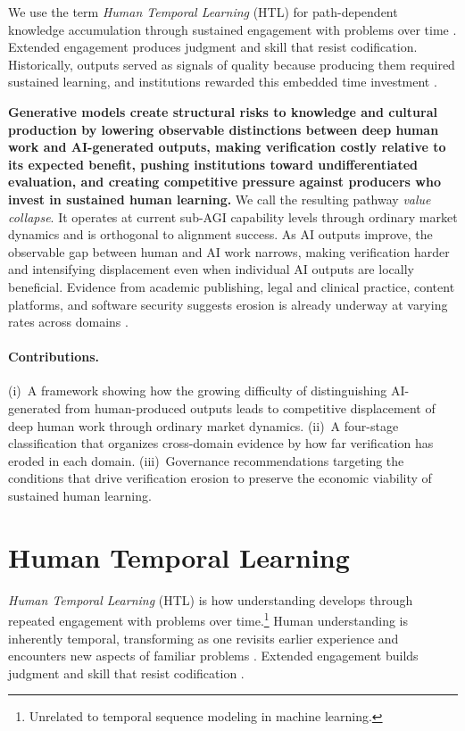 \documentclass{article}
\theoremstyle{plain}
\theoremstyle{definition}
\theoremstyle{remark}
\begin{document}
We use the term \emph{Human Temporal Learning} (HTL) for path-dependent knowledge accumulation through sustained engagement with problems over time \citep{Polanyi1966-POLTTD}. Extended engagement produces judgment and skill that resist codification. Historically, outputs served as signals of quality because producing them required sustained learning, and institutions rewarded this embedded time investment \citep{spence1973signaling}. 

\textbf{Generative models create structural risks to knowledge and cultural production by lowering observable distinctions between deep human work and AI-generated outputs, making verification costly relative to its expected benefit, pushing institutions toward undifferentiated evaluation, and creating competitive pressure against producers who invest in sustained human learning.} We call the resulting pathway \emph{value collapse}. It operates at current sub-AGI capability levels through ordinary market dynamics and is orthogonal to alignment success. As AI outputs improve, the observable gap between human and AI work narrows, making verification harder and intensifying displacement even when individual AI outputs are locally beneficial. Evidence from academic publishing, legal and clinical practice, content platforms, and software security suggests erosion is already underway at varying rates across domains \citep{liang-etal-2025-quantifying, suchak-etal-2025-explosion, esau-etal-2025-gptzero, brynjolfsson2025canaries}. 

\paragraph{Contributions.}
(i)~A framework showing how the growing difficulty of distinguishing AI-generated from human-produced outputs leads to competitive displacement of deep human work through ordinary market dynamics.
(ii)~A four-stage classification that organizes cross-domain evidence by how far verification has eroded in each domain.
(iii)~Governance recommendations targeting the conditions that drive verification erosion to preserve the economic viability of sustained human learning. 



\section{Human Temporal Learning}
\label{sec:htl}

\emph{Human Temporal Learning} (HTL) is how understanding develops through repeated engagement with problems over time.\footnote{Unrelated to temporal sequence modeling in machine learning.} Human understanding is inherently temporal, transforming as one revisits earlier experience and encounters new aspects of familiar problems \citep{Husserl1954-HUSKDW, Heidegger1927-HEISUZ}. Extended engagement builds judgment and skill that resist codification \citep{Polanyi1966-POLTTD}. 
\end{document}

